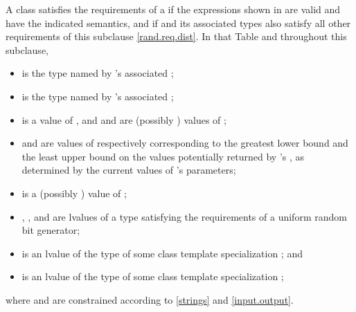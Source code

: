 \pnum
A class 
satisfies the requirements
of a 
if the expressions shown
in 
are valid and have the indicated semantics,
and if  and its associated types
also satisfy all other requirements
of this subclause \ref{rand.req.dist}.
In that Table and throughout this subclause,
\begin{itemize}
  \item
     is the type named by
    's associated ;
  \item
     is the type named by
    's associated ;
  \item
     is a
    value of ,
    and
     and  are (possibly ) values of ;
  \item
     and 
    are values of 
    respectively corresponding to
    the greatest lower bound and the least upper bound
    on the values potentially returned by 's ,
    as determined by the current values of 's parameters;
  \item
     is a (possibly ) value of ;
  \item
    , , and  are lvalues of a type
    satisfying the requirements
    of a uniform random bit generator;
  \item
     is an lvalue of the type of some class template specialization
     ;
  and
  \item
     is an lvalue of the type of some class template specialization
     ;
\end{itemize}
where  and  are constrained
according to \ref{strings} and \ref{input.output}.

